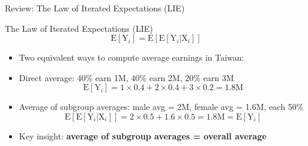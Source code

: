 \documentclass[dvipsnames,hyperref={pdfpagelabels=false}]{beamer}
\begin{document}

\begin{frame}{Review: The Law of Iterated Expectations (LIE)}
	
	\begin{block}{The Law of Iterated Expectations (LIE)}
		\begin{equation*}
		\mathrm{E}[\mathrm{Y}_{i}] = \mathrm{E}[\mathrm{E}[\mathrm{Y}_{i} | \mathrm{X}_{i}]]
		\end{equation*}
	\end{block}
	
	\begin{itemize}
		\item Two equivalent ways to compute average earnings in Taiwan:
		\vspace{0.2cm}
		\item[1] Direct average: 40\% earn 1M, 40\% earn 2M, 20\% earn 3M
		\begin{equation*}
		\mathrm{E}[\mathrm{Y}_{i}] = 1 \times 0.4 + 2 \times 0.4 + 3 \times 0.2 = 1.8 \text{M}
		\end{equation*}
		\item[2] Average of subgroup averages: male avg = 2M, female avg = 1.6M, each 50\%
		\begin{equation*}
		\mathrm{E}[\mathrm{E}[\mathrm{Y}_{i}|\mathrm{X}_{i}]] = 2 \times 0.5 + 1.6 \times 0.5 = 1.8\text{M} = \mathrm{E}[\mathrm{Y}_{i}]
		\end{equation*}
		\vspace{0.1cm}
		\item Key insight: \textbf{average of subgroup averages = overall average}
	\end{itemize}
\end{frame}


\end{document}
